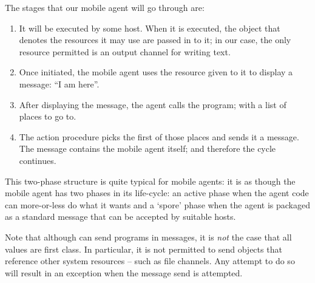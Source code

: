 The stages that our mobile agent will go through are:
\begin{enumerate}
\item It will be executed by some host. When it is executed, the object that denotes the resources it may use are passed in to it; in our case, the only resource permitted is an output channel for writing text.

\item Once initiated, the mobile agent uses the resource given to it to display a message: ``I am here''.

\item After displaying the message, the agent calls the  program; with a list of places to go to.

\item The  action procedure picks the first of those places and sends it a message. The message contains the mobile agent itself; and therefore the cycle continues.
\end{enumerate}
This two-phase structure is quite typical for mobile agents: it is as though the mobile agent has two phases in its life-cycle: an active phase when the agent code can more-or-less do what it wants and a `spore' phase when the agent is packaged as a standard message that can be accepted by suitable hosts.

Note that although \go can send programs in messages, it is \emph{not} the case that all values are first class. In particular, it is not permitted to send objects that reference other system resources -- such as file channels. Any attempt to do so will result in an  exception when the message send is attempted.


